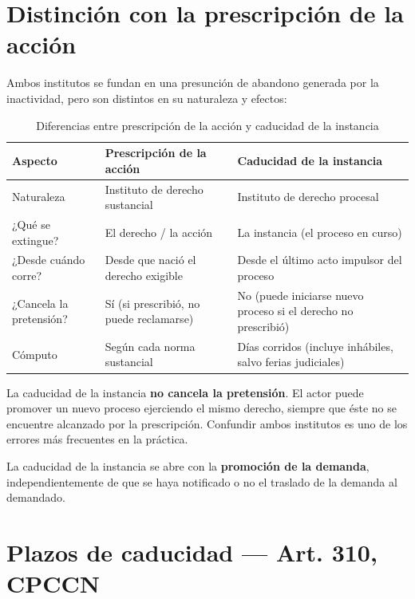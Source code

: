\documentclass[12pt,oneside]{book}
\begin{document}
\section{Distinción con la prescripción de la acción}

Ambos institutos se fundan en una presunción de abandono generada por la inactividad, pero son distintos en su naturaleza y efectos:

\begin{table}[H]
\centering
\begin{tabularx}{\textwidth}{
    >{\raggedright\arraybackslash}p{}
    >{\raggedright\arraybackslash}X
    >{\raggedright\arraybackslash}X
}
\toprule
\textbf{Aspecto} & \textbf{Prescripción de la acción} & \textbf{Caducidad de la instancia} \\
\midrule
Naturaleza & Instituto de derecho sustancial & Instituto de derecho procesal \\
\addlinespace
¿Qué se extingue? & El derecho / la acción & La instancia (el proceso en curso) \\
\addlinespace
¿Desde cuándo corre? & Desde que nació el derecho exigible & Desde el último acto impulsor del proceso \\
\addlinespace
¿Cancela la pretensión? & Sí (si prescribió, no puede reclamarse) & No (puede iniciarse nuevo proceso si el derecho no prescribió) \\
\addlinespace
Cómputo & Según cada norma sustancial & Días corridos (incluye inhábiles, salvo ferias judiciales) \\
\bottomrule
\end{tabularx}
\caption{Diferencias entre prescripción de la acción y caducidad de la instancia}
\end{table}

\begin{important}
La caducidad de la instancia \textbf{no cancela la pretensión}. El actor puede promover un nuevo proceso ejerciendo el mismo derecho, siempre que éste no se encuentre alcanzado por la prescripción. Confundir ambos institutos es uno de los errores más frecuentes en la práctica.
\end{important}

La caducidad de la instancia se abre con la \textbf{promoción de la demanda}, independientemente de que se haya notificado o no el traslado de la demanda al demandado.

\section{Plazos de caducidad --- Art. 310, CPCCN}
\end{document}
